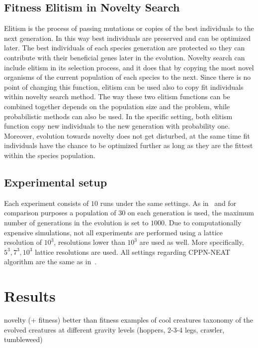 \documentclass{sig-alternate}
\begin{document}
\subsection{Fitness Elitism in Novelty Search}

Elitism is the process of passing mutations or copies of the best individuals to the next generation. In this way best individuals are preserved and can be optimized later. The best individuals of each species generation are protected so they can contribute with their beneficial genes later in the evolution. Novelty search can include elitism in its selection process, and it does that by copying the most novel organisms of the current population of each species to the next. Since there is no point of changing this function, elitism can be used also to copy fit individuals within novelty search method. The way these two elitism functions can be combined together depends on the population size and the problem, while probabilistic methods can also be used. In the specific setting, both elitism function copy new individuals to the new generation with probability one. Moreover, evolution towards novelty does not get disturbed, at the same time fit individuals have the chance to be optimized further as long as they are the fittest within the species population. 

\subsection{Experimental setup}
Each experiment consists of $10$ runs under the same settings. As in~\cite{cheney2013unshackling} and for comparison purposes a population of $30$ on each generation is used, the maximum number of generations in the evolution is set to $1000$. Due to computationally expensive simulations, not all experiments are performed using a lattice resolution of $10^3$, resolutions lower than $10^3$ are used as well. More specifically, $5^3, 7^3, 10^3$ lattice resolutions are used. All settings regarding CPPN-NEAT algorithm are the same as in~\cite{cheney2013unshackling}.


\section{Results}
novelty (+ fitness) better than fitness
examples of cool creatures
taxonomy of the evolved creatures at different gravity levels (hoppers, 2-3-4 legs, crawler, tumbleweed)
\end{document}
